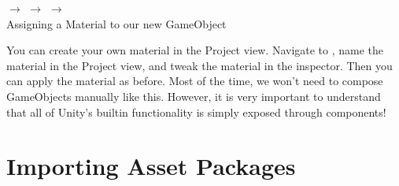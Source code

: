 \documentclass[11pt]{article}
\begin{document}
\begin{center}
\centering \noindent
{} $\rightarrow$
 $\rightarrow$
 $\rightarrow$
 \\
Assigning a Material to our new GameObject
\end{center}

You can create your own material in the Project view.  Navigate to , name the material in the Project view, and tweak the material in the inspector.  Then you can apply the material as before.  Most of the time, we won't need to compose GameObjects manually like this.  However, it is very important to understand that all of Unity's builtin functionality is simply exposed through components!

\section{Importing Asset Packages}
\end{document}
